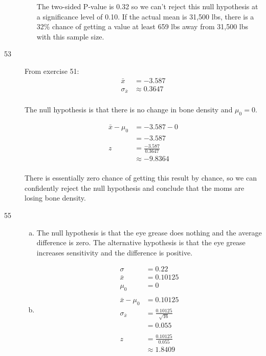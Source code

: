 \documentclass[letterpaper, landscape]{exam}
\begin{document}
\begin{description}
\begin{enumerate}[(a)]
            The two-sided P-value is 0.32 so we can't reject this null hypothesis
            at a significance level of 0.10. If the actual mean is 31,500 lbs,
            there is a 32\% chance of getting a value at least 659 lbs away from
            31,500 lbs with this sample size.

        \end{enumerate}

      \item[53]
        From exercise 51:
        \begin{align*}
            \bar{x}          & = -3.587 \\
            \sigma_{\bar{x}} & \approx 0.3647 \\
        \end{align*}

        The null hypothesis is that there is no change in bone density and
        $\mu_0 = 0$.

        \begin{align*}
          \bar{x} - \mu_0 & = -3.587 - 0 \\
                          & = -3.587 \\
          z & = \frac{-3.587}{0.3647} \\
            & \approx -9.8364 \\
        \end{align*}

        There is essentially zero chance of getting this result by chance,
        so we can confidently reject the null hypothesis and conclude that
        the moms are losing bone density.

      \item[55]
        \begin{enumerate}[(a)]
          \item The null hypothesis is that the eye grease does nothing and the
            average difference is zero. The alternative hypothesis is that the
            eye grease increases sensitivity and the difference is positive.

          \item
            \begin{align*}
              \sigma  & = 0.22 \\
              \bar{x} & = 0.10125 \\
              \mu_0   & = 0 \\
              \\
              \bar{x} - \mu_0  & = 0.10125 \\
              \sigma_{\bar{x}} & = \frac{0.10125}{\sqrt{16}} \\
                               & = 0.055 \\
              \\
              z & = \frac{0.10125}{0.055} \\
                & \approx 1.8409 \\
            \end{align*}


\end{enumerate}
\end{description}
\end{document}
